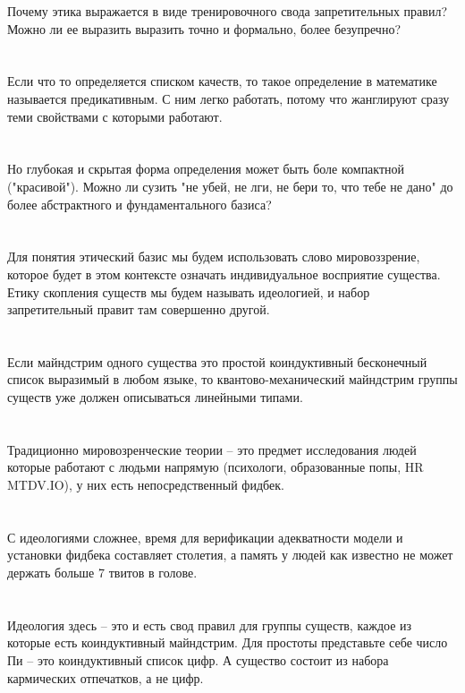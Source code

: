 Почему этика выражается в виде тренировочного свода запретительных правил? Можно ли ее выразить выразить точно и формально, более безупречно?\\
\\
\\
Если что то определяется списком качеств, то такое определение в математике называется предикативным. С ним легко работать, потому что жанглируют сразу теми свойствами с которыми работают.\\
\\
\\
Но глубокая и скрытая форма определения может быть боле компактной ("красивой"). Можно ли сузить "не убей, не лги, не бери то, что тебе не дано" до более абстрактного и фундаментального базиса?\\
\\
\\
Для понятия этический базис мы будем использовать слово мировоззрение, которое будет в этом контексте означать индивидуальное восприятие существа. Етику скопления существ мы будем называть идеологией, и набор запретительный правит там совершенно другой.\\
\\
\\
Если майндстрим одного существа это простой коиндуктивный бесконечный список выразимый в любом языке, то квантово-механический майндстрим группы существ уже должен описываться линейными типами.\\
\\
\\
Традиционно мировозренческие теории -- это предмет исследования людей которые работают с людьми напрямую (психологи, образованные попы, HR MTDV.IO), у них есть непосредственный фидбек.\\
\\
\\
С идеологиями сложнее, время для верификации адекватности модели и установки фидбека составляет столетия, а память у людей как известно не может держать больше 7 твитов в голове.\\
\\
\\
Идеология здесь -- это и есть свод правил для группы существ, каждое из которые есть коиндуктивный майндстрим. Для простоты представьте себе число Пи -- это коиндуктивный список цифр. А существо состоит из набора кармических отпечатков, а не цифр.\\
\\
\\
